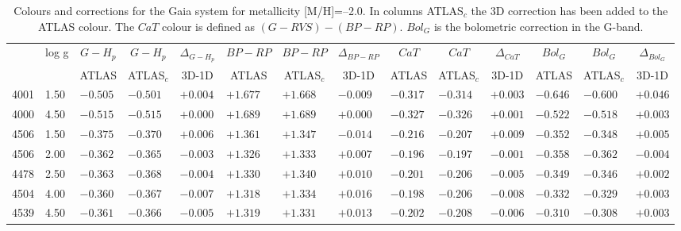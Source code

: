 \documentclass[]{aa}
\def\teff{$T\rm_{eff}$}
\begin{document}
\begin{appendix}
\begin{table*}
\caption{\label{Gaiam20}
Colours and corrections for the Gaia system for metallicity [M/H]=--2.0. In columns ATLAS$_c$ the 3D correction
has been added to the ATLAS colour. The $CaT$ colour is defined as $(G-RVS)-(BP-RP)$. $Bol_G$ is the bolometric
correction in the G-band. }
\renewcommand{\tabcolsep}{3pt}
\tabskip=0pt
\begin{center}
\begin{tabular}{llllllllllllll}
\hline\noalign{\smallskip}
\multicolumn{1}{c}{\teff} & 
\multicolumn{1}{c}{log g} & 
\multicolumn{1}{c}{$G-H_p$} &
\multicolumn{1}{c}{$G-H_p$} &
\multicolumn{1}{c}{$\Delta_{G-H_p}$} &
\multicolumn{1}{c}{$BP-RP$} &
\multicolumn{1}{c}{$BP-RP$} &
\multicolumn{1}{c}{$\Delta_{BP-RP}$} &
\multicolumn{1}{c}{$CaT$} &
\multicolumn{1}{c}{$CaT$} &
\multicolumn{1}{c}{$\Delta_{CaT}$} & 
\multicolumn{1}{c}{$Bol_G$} &
\multicolumn{1}{c}{$Bol_G$} &
\multicolumn{1}{c}{$\Delta_{Bol_G}$} \\
\multicolumn{2}{c}{ } &  
\multicolumn{1}{c}{ATLAS} &
\multicolumn{1}{c}{ATLAS$_c$}&
\multicolumn{1}{c}{3D-1D}&
\multicolumn{1}{c}{ATLAS} &
\multicolumn{1}{c}{ATLAS$_c$}&
\multicolumn{1}{c}{3D-1D}&
\multicolumn{1}{c}{ATLAS} &
\multicolumn{1}{c}{ATLAS$_c$}&
\multicolumn{1}{c}{3D-1D}&
\multicolumn{1}{c}{ATLAS} &
\multicolumn{1}{c}{ATLAS$_c$}&
\multicolumn{1}{c}{3D-1D} \\
\hline\noalign{\smallskip}
\hline\noalign{\smallskip}
4001  &1.50 & $-0.505$ &$ -0.501$ &$ +0.004$ &$ +1.677$ &$ +1.668$ &$ -0.009$ &$ -0.317$ &$ -0.314$ &$ +0.003$ &$ -0.646$&$ -0.600$&$ +0.046$\\
4000  &4.50 & $-0.515$ &$ -0.515$ &$ +0.000$ &$ +1.689$ &$ +1.689$ &$ +0.000$ &$ -0.327$ &$ -0.326$ &$ +0.001$ &$ -0.522$&$ -0.518$&$ +0.003$\\
4506  &1.50 & $-0.375$ &$ -0.370$ &$ +0.006$ &$ +1.361$ &$ +1.347$ &$ -0.014$ &$ -0.216$ &$ -0.207$ &$ +0.009$ &$ -0.352$&$ -0.348$&$ +0.005$\\
4506  &2.00 & $-0.362$ &$ -0.365$ &$ -0.003$ &$ +1.326$ &$ +1.333$ &$ +0.007$ &$ -0.196$ &$ -0.197$ &$ -0.001$ &$ -0.358$&$ -0.362$&$ -0.004$\\
4478  &2.50 & $-0.363$ &$ -0.368$ &$ -0.004$ &$ +1.330$ &$ +1.340$ &$ +0.010$ &$ -0.201$ &$ -0.206$ &$ -0.005$ &$ -0.349$&$ -0.346$&$ +0.002$\\
4504  &4.00 & $-0.360$ &$ -0.367$ &$ -0.007$ &$ +1.318$ &$ +1.334$ &$ +0.016$ &$ -0.198$ &$ -0.206$ &$ -0.008$ &$ -0.332$&$ -0.329$&$ +0.003$\\
4539  &4.50 & $-0.361$ &$ -0.366$ &$ -0.005$ &$ +1.319$ &$ +1.331$ &$ +0.013$ &$ -0.202$ &$ -0.208$ &$ -0.006$ &$ -0.310$&$ -0.308$&$ +0.003$\\

\end{tabular}
\end{center}
\end{table*}
\end{appendix}
\end{document}
